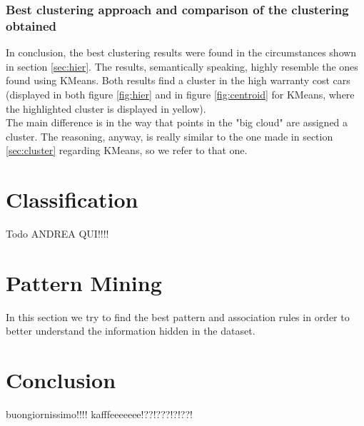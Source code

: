 \documentclass{article}
\begin{document}
\subsubsection{Best clustering approach and comparison of the clustering obtained}
In conclusion, the best clustering results were found in the circumstances shown in section \ref{sec:hier}. The results, semantically speaking, highly resemble the ones found using KMeans. Both results find a cluster in the high warranty cost cars (displayed in both figure \ref{fig:hier} and in figure \ref{fig:centroid} for KMeans, where the highlighted cluster is displayed in yellow).\\
The main difference is in the way that points in the "big cloud" are assigned a cluster. The reasoning, anyway, is really similar to the one made in section \ref{sec:cluster} regarding KMeans, so we refer to that one.



\section{Classification}

Todo ANDREA QUI!!!!



\section{Pattern Mining}
In this section we try to find the best pattern and association rules in order to better understand the information hidden in the dataset. 

\section{Conclusion}
buongiornissimo!!!! kafffeeeeeee!??!???!?!??!
\end{document}
